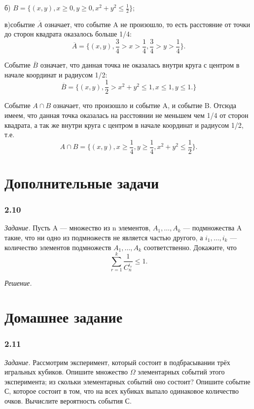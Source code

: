 \documentclass{book}
\begin{document}
б) $B=\{(x, y), x\geq 0, y\geq 0, x^2+y^2\leq\frac{1}{2}\}$;

в)событие $\overline{A}$ означает, что событие A не произошло, то есть расстояние от точки до сторон квадрата оказалось больше 1/4: $$\overline{A}=\{(x, y), \frac{3}{4}>x>\frac{1}{4}, \frac{3}{4}>y>\frac{1}{4}\}.$$

Событие $\overline{B}$ означает, что данная точка не оказалась внутри круга с центром в начале координат и радиусом 1/2: $$\overline{B}=\{(x, y), \frac{1}{2}>x^2+y^2\leq 1, x\leq 1, y\leq 1.\}$$

Событие $A\cap B$ означает, что произошло и событие A, и событие B. Отсюда имеем, что данная точка оказалась на расстоянии не меньшем чем 1/4 от сторон квадрата, а так же внутри круга с центром в начале координат и радиусом 1/2, т.е. $$A\cap B=\{(x, y), x\geq\frac{1}{4}, y\geq\frac{1}{4}, x^2+y^2\leq\frac{1}{2}\}.$$

\section*{Дополнительные задачи}

\subsubsection*{2.10}

\textit{Задание.} Пусть A --- множество из n элементов, $A_1,  \dotsc , A_k$ --- подмножества A такие, что ни одно из подмножеств не является частью другого, а $i_1,  \dotsc , i_k$ --- количество элементов подмножеств $A_1,  \dotsc , A_k$ соответственно. Докажите, что $$\sum\limits_{r=1}^k\frac{1}{C_n^{i_r}}\leq 1.$$

\textit{Решение.}

\section*{Домашнее задание}

\subsubsection*{2.11}

\textit{Задание.} Рассмотрим эксперимент, который состоит в подбрасывании трёх игральных кубиков. Опишите множество $\Omega$ элементарных событий этого эксперимента; из скольки элементарных событий оно состоит? Опишите событие С, которое состоит в том, что на всех кубиках выпало одинаковое количество очков. Вычислите вероятность события С.
\end{document}
